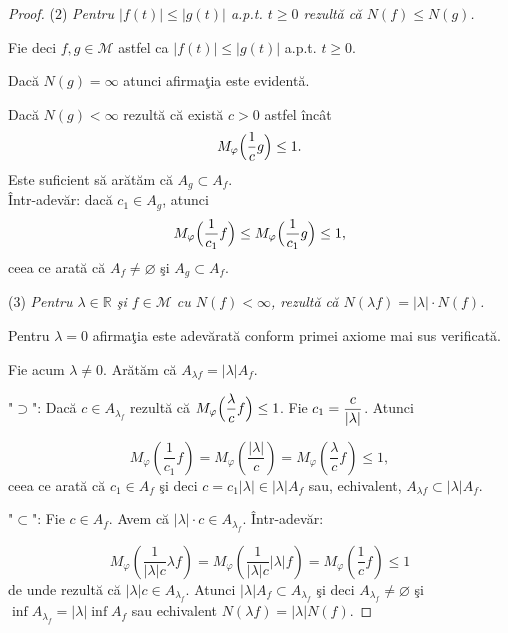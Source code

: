 \documentclass[ a4paper, 12pt]{report}
\theoremstyle{definition}
\theoremstyle{remark}
\numberwithin{equation}{section}
\begin{document}
\begin{proof}
($2$) {\it Pentru $\lvert f(t) \rvert \leq \lvert g(t) \rvert$ a.p.t. $t \geq 0$ rezult\u a c\u a $N(f) \leq N(g)$.}

\smallskip

Fie deci $f, g \in \mathcal{M}$ astfel ca $\lvert f(t) \rvert \leq \lvert g(t) \rvert$ a.p.t. $t \geq 0$.

Dac\u a $N(g) = \infty$ atunci afirma\c tia este evident\u a.

Dac\u a $N(g) < \infty$ rezult\u a c\u a exist\u a $c >0$ astfel \^inc\^at
$$M_\varphi \Big(\displaystyle\frac{1}{c} g\Big) \leq 1.$$
Este suficient s\u a ar\u at\u am c\u a $A_g \subset A_f$.\\
 \^ Intr-adev\u ar: dac\u a $c_1 \in A_g$, atunci
$$M_\varphi\Big(\displaystyle\frac{1}{c_1}f\Big) \leq M_\varphi\Big(\displaystyle\frac{1}{c_1}g\Big) \leq 1,$$ ceea ce arat\u a c\u a $A_f \neq \varnothing$ \c si $A_g \subset A_f$.

\smallskip

($3$) {\it Pentru $\lambda \in \mathbb{R}$ \c si $f \in \mathcal{M}$ cu $N(f) < \infty$, rezult\u a c\u a $N(\lambda f) = \lvert \lambda \rvert\cdot N(f)$.}

\smallskip

Pentru $\lambda = 0$ afirma\c tia este adev\u arat\u a conform primei axiome mai sus verificat\u a.

Fie acum $\lambda \neq 0$. Ar\u at\u am c\u a $A_{\lambda f} = \lvert \lambda \rvert A_f$.

"$\supset$": Dac\u a $c \in A_{\lambda_f}$ rezult\u a c\u a $M_\varphi\Big(\displaystyle\frac{\lambda}{c}f \Big) \leq 1$.
Fie $c_1 = \displaystyle\frac{c}{\lvert \lambda \rvert}$. Atunci

$$M_\varphi\left (\frac{1}{c_1}f \right ) = M_\varphi \left (\frac{\lvert \lambda \rvert}{c} \right ) = M_\varphi \left (\frac{\lambda}{c} f \right ) \leq 1,$$
ceea ce arat\u a c\u a $c_1 \in A_f$ \c si deci $ c = c_1 \lvert \lambda \rvert \in \lvert \lambda \rvert A_f$ sau, echivalent, $A_{\lambda f} \subset \lvert \lambda \rvert A_f$.

"$\subset$": Fie $c \in A_f$. Avem c\u a $\lvert \lambda \rvert\cdot c \in A_{\lambda_f}$. \^ Intr-adev\u ar:

$$M_\varphi \left (\frac{1}{\lvert \lambda\rvert c} \lambda f \right ) = M_\varphi \left (\frac{1}{\lvert \lambda\rvert c}\lvert\lambda\rvert f \right ) = M_\varphi \left (\frac{1}{c} f \right ) \leq 1$$ de unde rezult\u a c\u a  $\lvert \lambda \rvert c \in A_{\lambda_f}$. Atunci $\lvert\lambda \rvert A_f \subset A_{\lambda_f}$ \c si deci $A_{\lambda_f} \neq \varnothing$ \c si $\inf A_{\lambda_f} = \lvert \lambda \rvert \inf A_f$ sau echivalent $N(\lambda f) = \lvert  \lambda \rvert N(f)$.


\end{proof}
\end{document}
